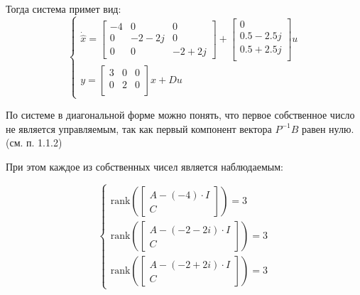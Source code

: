 Тогда система примет вид: 
\begin{equation}
    \begin{cases}
        \dot{\hat{x}} = \begin{bmatrix}
            -4 & 0 & 0 \\
            0 & -2-2j & 0 \\
            0 & 0 & -2+2j
        \end{bmatrix} + \begin{bmatrix}
            0 \\
            0.5-2.5j \\
            0.5+2.5j \\
        \end{bmatrix} u \\ 
        y = \begin{bmatrix}
            3 & 0 & 0 \\
            0 & 2 & 0 \\
        \end{bmatrix} \hat{x} + Du 
    \end{cases}
    \label{eq:task4_diag}
\end{equation}

По системе в диагональной форме можно понять, что первое собственное число 
не является управляемым, так как первый компонент вектора $P^{-1}B$ равен нулю. (см. п. 1.1.2) 

При этом каждое из собственных чисел является наблюдаемым:

\[
\begin{cases}
    \text{rank}\left(
    \begin{bmatrix}
    A - (-4) \cdot I \\
    C
    \end{bmatrix}
    \right) = 3 \\
    \text{rank}\left(
    \begin{bmatrix}
    A - (-2 - 2i) \cdot I \\
    C
    \end{bmatrix}
    \right) = 3 \\
    \text{rank}\left(
    \begin{bmatrix}
    A - (-2 + 2i) \cdot I \\
    C
    \end{bmatrix}
    \right) = 3
\end{cases}
\]



